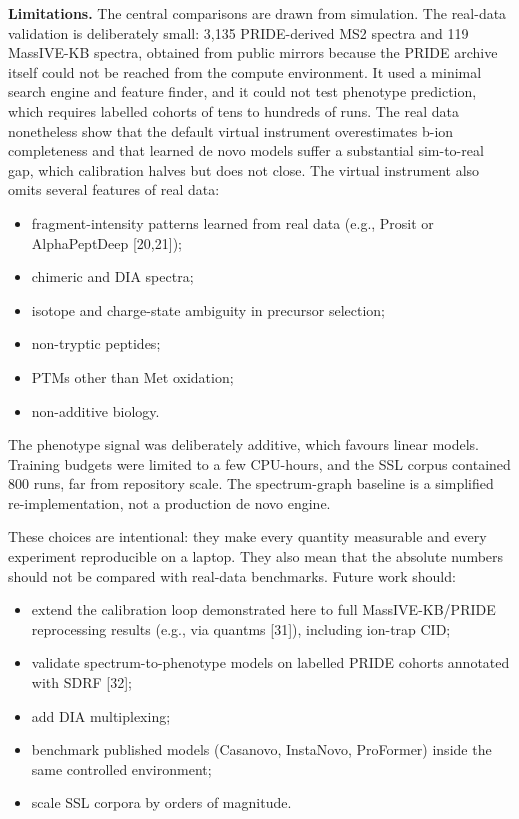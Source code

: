 \documentclass[
]{article}
\providecommand{\tightlist}{%
  \setlength{\itemsep}{0pt}\setlength{\parskip}{0pt}}
\begin{document}
\textbf{Limitations.} The central comparisons are drawn from simulation.
The real-data validation is deliberately small: 3,135 PRIDE-derived MS2
spectra and 119 MassIVE-KB spectra, obtained from public mirrors because
the PRIDE archive itself could not be reached from the compute
environment. It used a minimal search engine and feature finder, and it
could not test phenotype prediction, which requires labelled cohorts of
tens to hundreds of runs. The real data nonetheless show that the
default virtual instrument overestimates b-ion completeness and that
learned de novo models suffer a substantial sim-to-real gap, which
calibration halves but does not close. The virtual instrument also omits
several features of real data:

\begin{itemize}
\tightlist
\item
  fragment-intensity patterns learned from real data (e.g., Prosit or
  AlphaPeptDeep {[}20,21{]});
\item
  chimeric and DIA spectra;
\item
  isotope and charge-state ambiguity in precursor selection;
\item
  non-tryptic peptides;
\item
  PTMs other than Met oxidation;
\item
  non-additive biology.
\end{itemize}

The phenotype signal was deliberately additive, which favours linear
models. Training budgets were limited to a few CPU-hours, and the SSL
corpus contained 800 runs, far from repository scale. The spectrum-graph
baseline is a simplified re-implementation, not a production de novo
engine.

These choices are intentional: they make every quantity measurable and
every experiment reproducible on a laptop. They also mean that the
absolute numbers should not be compared with real-data benchmarks.
Future work should:

\begin{itemize}
\tightlist
\item
  extend the calibration loop demonstrated here to full MassIVE-KB/PRIDE
  reprocessing results (e.g., via quantms {[}31{]}), including ion-trap
  CID;
\item
  validate spectrum-to-phenotype models on labelled PRIDE cohorts
  annotated with SDRF {[}32{]};
\item
  add DIA multiplexing;
\item
  benchmark published models (Casanovo, InstaNovo, ProFormer) inside the
  same controlled environment;
\item
  scale SSL corpora by orders of magnitude.
\end{itemize}
\end{document}
